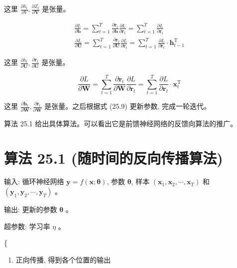 \documentclass[10pt]{article}
\begin{document}
这里 $\frac{\partial h_{t}}{\partial V}, \frac{\partial Z_{t}}{\partial \boldsymbol{V}}$ 是张量。


\begin{gather*}
\frac{\partial L}{\partial \boldsymbol{b}}=\sum_{t=1}^{T} \frac{\partial \boldsymbol{r}_{t}}{\partial \boldsymbol{b}} \frac{\partial L}{\partial \boldsymbol{r}_{t}}=\sum_{t=1}^{T} \frac{\partial L}{\partial \boldsymbol{r}_{t}}  \tag{25.16}\\
\frac{\partial L}{\partial \boldsymbol{U}}=\sum_{t=1}^{T} \frac{\partial \boldsymbol{r}_{t}}{\partial \boldsymbol{U}} \frac{\partial L}{\partial \boldsymbol{r}_{t}}=\sum_{t=1}^{T} \frac{\partial L}{\partial \boldsymbol{r}_{t}} \cdot \boldsymbol{h}_{t-1}^{\mathrm{T}} \tag{25.17}
\end{gather*}


这里 $\frac{\partial h_{t}}{\partial \boldsymbol{U}}, \frac{\partial \boldsymbol{r}_{t}}{\partial \boldsymbol{U}}$ 是张量。


\begin{equation*}
\frac{\partial L}{\partial \boldsymbol{W}}=\sum_{t=1}^{T} \frac{\partial \boldsymbol{r}_{t}}{\partial \boldsymbol{W}} \frac{\partial L}{\partial \boldsymbol{r}_{t}}=\sum_{t=1}^{T} \frac{\partial L}{\partial \boldsymbol{r}_{t}} \cdot \boldsymbol{x}_{t}^{\mathrm{T}} \tag{25.18}
\end{equation*}


这里 $\frac{\partial \boldsymbol{h}_{t}}{\partial \boldsymbol{W}}, \frac{\partial \boldsymbol{r}_{t}}{\partial \boldsymbol{W}}$ 是张量。之后根据式 (25.9) 更新参数, 完成一轮迭代。

算法 25.1 给出具体算法。可以看出它是前馈神经网络的反馈向算法的推广。

\section*{算法 25.1 (随时间的反向传播算法)}
输入: 循环神经网络 $\boldsymbol{y}=f(\boldsymbol{x} ; \boldsymbol{\theta})$, 参数 $\boldsymbol{\theta}$, 样本 $\left(\boldsymbol{x}_{1}, \boldsymbol{x}_{2}, \cdots, \boldsymbol{x}_{T}\right)$ 和 $\left(\boldsymbol{y}_{1}, \boldsymbol{y}_{2}, \cdots, \boldsymbol{y}_{T}\right)$ 。

输出: 更新的参数 $\boldsymbol{\theta}$ 。

超参数: 学习率 $\eta$ 。

\{

\begin{enumerate}
  \item 正向传播, 得到各个位置的输出
\end{enumerate}
\end{document}
